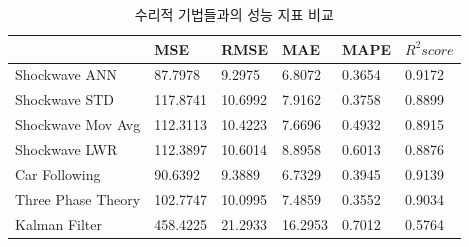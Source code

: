 \documentclass[11pt]{report}
\begin{document}
\begin{table}[H]
	\begin{center}
	\vspace{0.5cm}
	\begin{tabular}{@{}llllll@{}}
		\toprule
										   & MSE                                                  & RMSE                                                & MAE                                                 & MAPE                                                & $R^2score$                                          \\ \midrule
		\multicolumn{1}{l|}{Shockwave ANN} & \multicolumn{1}{l|}{\cellcolor[HTML]{C0C0C0}87.7978} & \multicolumn{1}{l|}{\cellcolor[HTML]{C0C0C0}9.2975} & 6.8072                                              & \multicolumn{1}{l|}{0.3654}                         & \multicolumn{1}{l|}{\cellcolor[HTML]{C0C0C0}0.9172} \\
		Shockwave STD                      & 117.8741                                             & 10.6992                                             & 7.9162                                              & 0.3758                                              & 0.8899                                              \\
		Shockwave Mov Avg                  & 112.3113                                             & 10.4223                                             & 7.6696                                              & 0.4932                                              & 0.8915                                              \\
		Shockwave LWR                      & 112.3897                                             & 10.6014                                             & 8.8958                                              & 0.6013                                              & 0.8876                                              \\
		Car Following                      & 90.6392                                              & \multicolumn{1}{l|}{9.3889}                         & \multicolumn{1}{l|}{\cellcolor[HTML]{C0C0C0}6.7329} & 0.3945                                              & 0.9139                                              \\
		Three Phase Theory                 & 102.7747                                             & 10.0995                                             & \multicolumn{1}{l|}{7.4859}                         & \multicolumn{1}{l|}{\cellcolor[HTML]{C0C0C0}0.3552} & 0.9034                                              \\
		Kalman Filter                     & 458.4225                                             & 21.2933                                             & 16.2953                                             & 0.7012                                              & 0.5764                                             
		\end{tabular}
	\end{center}
	\caption{수리적 기법들과의 성능 지표 비교}
	\label{tab:math_eval}
\end{table}
\end{document}
